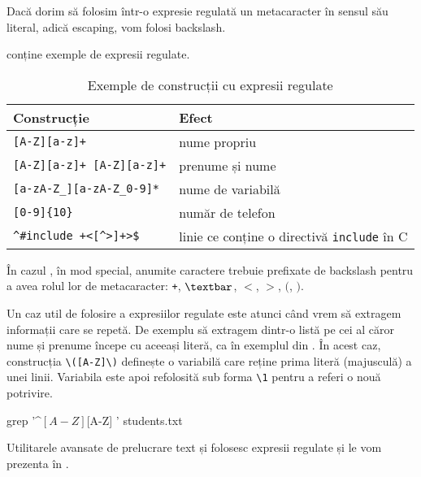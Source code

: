 Dacă dorim să folosim într-o expresie regulată un metacaracter în sensul său literal, adică escaping, vom folosi backslash.

 conține exemple de expresii regulate.

\begin{table}[!htb]
  \begin{center}
    \begin{tabular}{ p{} p{} }
      \toprule
        \textbf{Construcție} &
        \textbf{Efect} \\
      \midrule
        \verb|[A-Z][a-z]+| &
        nume propriu \\
      \midrule
        \verb|[A-Z][a-z]+ [A-Z][a-z]+| &
        prenume și nume \\
      \midrule
        \verb|[a-zA-Z_][a-zA-Z_0-9]*| &
        nume de variabilă \\
      \midrule
        \verb|[0-9]{10}| &
        număr de telefon \\
      \midrule
        \verb|^#include +<[^>]+>$| &
        linie ce conține o directivă \texttt{include} în C \\
      \bottomrule
    \end{tabular}
  \end{center}
  \caption{Exemple de construcții cu expresii regulate}
  \label{tab:cli:regex-example}
\end{table}

În cazul , în mod special, anumite caractere trebuie prefixate de backslash pentru a avea rolul lor de metacaracter: \texttt{+}, \texttt{$\textbar$}, \texttt{$<$}, \texttt{$>$}, \texttt{$($}, \texttt{$)$}.

Un caz util de folosire a expresiilor regulate este atunci când vrem să extragem informații care se repetă.
De exemplu să extragem dintr-o listă pe cei al căror nume și prenume începe cu aceeași literă, ca în exemplul din .
În acest caz, construcția \verb|\([A-Z]\)| definește o variabilă care reține prima literă (majusculă) a unei linii.
Variabila este apoi refolosită sub forma \verb|\1| pentru a referi o nouă potrivire.

\begin{screen}[caption={Expresii regulate cu variabile},escapechar=,label={lst:cli:regex-var}]
grep '^\([A-Z]\)[A-Z]\+ \1' students.txt
\end{screen}

Utilitarele avansate de prelucrare text  și  folosesc expresii regulate și le vom prezenta în .

